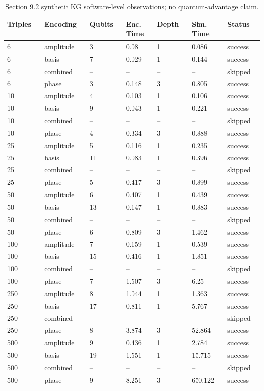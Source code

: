 \begin{table}[t]
\centering
\scriptsize
\setlength{\tabcolsep}{2pt}
\renewcommand{\arraystretch}{1.08}
\caption{Section 9.2 synthetic KG software-level observations; no quantum-advantage claim.}
\label{tab:chapter9-synthetic-observations}
\begin{tabular}{@{}p{0.085\linewidth}p{0.085\linewidth}p{0.085\linewidth}p{0.085\linewidth}p{0.085\linewidth}p{0.085\linewidth}p{0.085\linewidth}@{}}
\hline
Triples & Encoding & Qubits & Enc. Time & Depth & Sim. Time & Status \\
\hline
6 & amplitude & 3 & 0.08 & 1 & 0.086 & success \\
6 & basis & 7 & 0.029 & 1 & 0.144 & success \\
6 & combined & -- & -- & -- & -- & skipped \\
6 & phase & 3 & 0.148 & 3 & 0.805 & success \\
10 & amplitude & 4 & 0.103 & 1 & 0.106 & success \\
10 & basis & 9 & 0.043 & 1 & 0.221 & success \\
10 & combined & -- & -- & -- & -- & skipped \\
10 & phase & 4 & 0.334 & 3 & 0.888 & success \\
25 & amplitude & 5 & 0.116 & 1 & 0.235 & success \\
25 & basis & 11 & 0.083 & 1 & 0.396 & success \\
25 & combined & -- & -- & -- & -- & skipped \\
25 & phase & 5 & 0.417 & 3 & 0.899 & success \\
50 & amplitude & 6 & 0.407 & 1 & 0.439 & success \\
50 & basis & 13 & 0.147 & 1 & 0.883 & success \\
50 & combined & -- & -- & -- & -- & skipped \\
50 & phase & 6 & 0.809 & 3 & 1.462 & success \\
100 & amplitude & 7 & 0.159 & 1 & 0.539 & success \\
100 & basis & 15 & 0.416 & 1 & 1.851 & success \\
100 & combined & -- & -- & -- & -- & skipped \\
100 & phase & 7 & 1.507 & 3 & 6.25 & success \\
250 & amplitude & 8 & 1.044 & 1 & 1.363 & success \\
250 & basis & 17 & 0.811 & 1 & 5.767 & success \\
250 & combined & -- & -- & -- & -- & skipped \\
250 & phase & 8 & 3.874 & 3 & 52.864 & success \\
500 & amplitude & 9 & 0.436 & 1 & 2.784 & success \\
500 & basis & 19 & 1.551 & 1 & 15.715 & success \\
500 & combined & -- & -- & -- & -- & skipped \\
500 & phase & 9 & 8.251 & 3 & 650.122 & success \\
\hline
\end{tabular}
\end{table}
